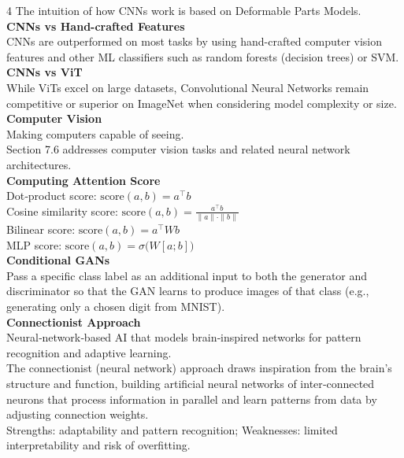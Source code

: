 \documentclass[8pt]{extarticle}
\begin{document}
\begin{multicols}{4}
The intuition of how CNNs work is based on Deformable Parts Models.\\
\vspace{2pt}\textbf{CNNs vs Hand-crafted Features}\\
CNNs are outperformed on most tasks by using hand-crafted computer vision features and other ML classifiers such as random forests (decision trees) or SVM.\\
\vspace{2pt}\textbf{CNNs vs ViT}\\
While ViTs excel on large datasets, Convolutional Neural Networks remain competitive or superior on ImageNet when considering model complexity or size.\\
\vspace{2pt}\textbf{Computer Vision}\\
Making computers capable of seeing.\\
Section 7.6 addresses computer vision tasks and related neural network architectures.\\
\vspace{2pt}\textbf{Computing Attention Score}\\
Dot‑product score: $\text{score}(a,b)=a^{\top} b$\\
Cosine similarity score: $\text{score}(a,b)=\frac{a^{\top} b}{\|a\|\cdot\|b\|}$\\
Bilinear score: $\text{score}(a,b)=a^{\top} W b$\\
MLP score: $\text{score}(a,b)=\sigma\big( W [a; b] \big)$\\
\vspace{2pt}\textbf{Conditional GANs}\\
Pass a specific class label as an additional input to both the generator and discriminator so that the GAN learns to produce images of that class (e.g., generating only a chosen digit from MNIST).\\
\vspace{2pt}\textbf{Connectionist Approach}\\
Neural‑network‑based AI that models brain‑inspired networks for pattern recognition and adaptive learning.\\
The connectionist (neural network) approach draws inspiration from the brain's structure and function, building artificial neural networks of inter‑connected neurons that process information in parallel and learn patterns from data by adjusting connection weights.\\
Strengths: adaptability and pattern recognition; Weaknesses: limited interpretability and risk of overfitting.\\


\end{multicols}
\end{document}
